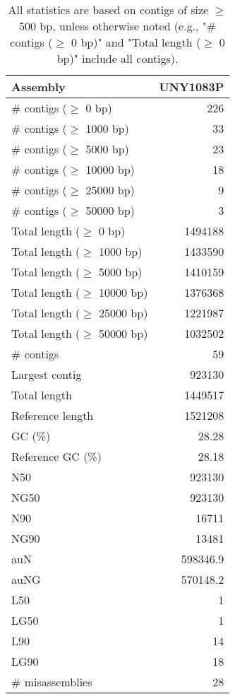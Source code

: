 \documentclass[12pt,a4paper]{article}
\begin{document}
\begin{table}[ht]
\begin{center}
\caption{All statistics are based on contigs of size $\geq$ 500 bp, unless otherwise noted (e.g., "\# contigs ($\geq$ 0 bp)" and "Total length ($\geq$ 0 bp)" include all contigs).}
\begin{tabular}{|l*{1}{|r}|}
\hline
Assembly & UNY1083P \\ \hline
\# contigs ($\geq$ 0 bp) & 226 \\ \hline
\# contigs ($\geq$ 1000 bp) & 33 \\ \hline
\# contigs ($\geq$ 5000 bp) & 23 \\ \hline
\# contigs ($\geq$ 10000 bp) & 18 \\ \hline
\# contigs ($\geq$ 25000 bp) & 9 \\ \hline
\# contigs ($\geq$ 50000 bp) & 3 \\ \hline
Total length ($\geq$ 0 bp) & 1494188 \\ \hline
Total length ($\geq$ 1000 bp) & 1433590 \\ \hline
Total length ($\geq$ 5000 bp) & 1410159 \\ \hline
Total length ($\geq$ 10000 bp) & 1376368 \\ \hline
Total length ($\geq$ 25000 bp) & 1221987 \\ \hline
Total length ($\geq$ 50000 bp) & 1032502 \\ \hline
\# contigs & 59 \\ \hline
Largest contig & 923130 \\ \hline
Total length & 1449517 \\ \hline
Reference length & 1521208 \\ \hline
GC (\%) & 28.28 \\ \hline
Reference GC (\%) & 28.18 \\ \hline
N50 & 923130 \\ \hline
NG50 & 923130 \\ \hline
N90 & 16711 \\ \hline
NG90 & 13481 \\ \hline
auN & 598346.9 \\ \hline
auNG & 570148.2 \\ \hline
L50 & 1 \\ \hline
LG50 & 1 \\ \hline
L90 & 14 \\ \hline
LG90 & 18 \\ \hline
\# misassemblies & 28 \\ \hline

\end{tabular}
\end{center}
\end{table}
\end{document}

